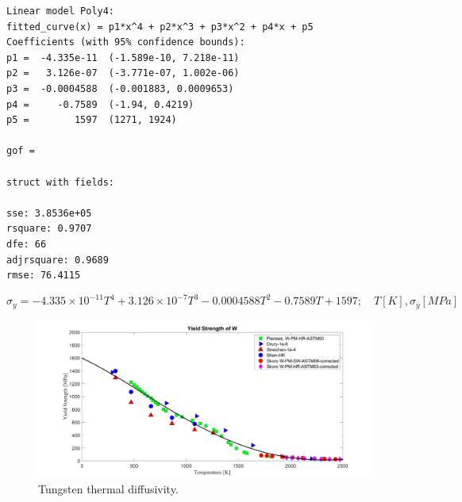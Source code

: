 \documentclass[12pt]{article}
\begin{document}
	\begin{verbatim}
Linear model Poly4:
fitted_curve(x) = p1*x^4 + p2*x^3 + p3*x^2 + p4*x + p5
Coefficients (with 95% confidence bounds):
p1 =  -4.335e-11  (-1.589e-10, 7.218e-11)
p2 =   3.126e-07  (-3.771e-07, 1.002e-06)
p3 =  -0.0004588  (-0.001883, 0.0009653)
p4 =     -0.7589  (-1.94, 0.4219)
p5 =        1597  (1271, 1924)

gof = 

struct with fields:

sse: 3.8536e+05
rsquare: 0.9707
dfe: 66
adjrsquare: 0.9689
rmse: 76.4115
	\end{verbatim}
	\begin{equation}
		\sigma_y= -4.335\times 10^{-11} T^4+ 3.126\times 10^{-7} T^3 -0.0004588T^2 -0.7589 T + 1597 ; \quad T[K], \sigma_y [MPa]
	\end{equation}
	
	

\begin{figure}[h!]
	\centering
	\includegraphics[width=0.75\linewidth]{W_yield_corrected}  
	\caption{Tungsten thermal diffusivity.}
	\label{fig:W_fab1}
\end{figure}
\end{document}
